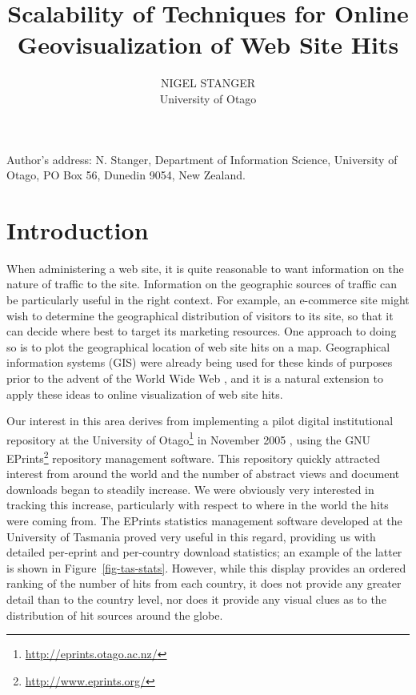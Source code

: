 \documentclass[acmtocl,acmnow]{acmtrans2m}
\title{Scalability of Techniques for Online Geovisualization of Web Site Hits}
\author{NIGEL STANGER \\ University of Otago}
\begin{document}


            
\begin{bottomstuff} 
Author's address: N. Stanger, Department of Information Science,
University of Otago, PO Box 56, Dunedin 9054, New Zealand.
\end{bottomstuff}
            
\maketitle


\section{Introduction}
\label{sec-introduction}

When administering a web site, it is quite reasonable to want
information on the nature of traffic to the site. Information on the
geographic sources of traffic can be particularly useful in the right
context. For example, an e-commerce site might wish to determine the
geographical distribution of visitors to its site, so that it can decide
where best to target its marketing resources. One approach to doing so
is to plot the geographical location of web site hits on a map.
Geographical information systems (GIS) were already being used for these
kinds of purposes prior to the advent of the World Wide Web
\cite{Beau-JR-1991-GIS}, and it is a natural extension to apply these
ideas to online visualization of web site hits.

Our interest in this area derives from implementing a pilot digital
institutional repository at the University of
Otago\footnote{\url{http://eprints.otago.ac.nz/}} in November 2005
\cite{Stan-N-2006-running}, using the GNU
EPrints\footnote{\url{http://www.eprints.org/}} repository management
software. This repository quickly attracted interest from around the
world and the number of abstract views and document downloads began to
steadily increase. We were obviously very interested in tracking this
increase, particularly with respect to where in the world the hits were
coming from. The EPrints statistics management software developed at the
University of Tasmania \cite{Sale-A-2006-stats} proved very useful in
this regard, providing us with detailed per-eprint and per-country
download statistics; an example of the latter is shown in
Figure~\ref{fig-tas-stats}. However, while this display provides an
ordered ranking of the number of hits from each country, it does not
provide any greater detail than to the country level, nor does it
provide any visual clues as to the distribution of hit sources around
the globe.
\end{document}
